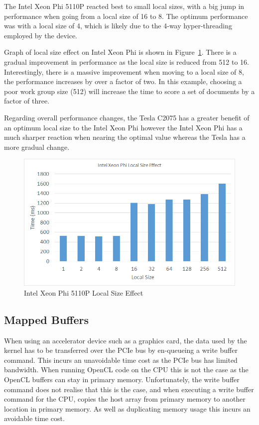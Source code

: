 The Intel Xeon Phi 5110P reacted best to small local sizes, with a big jump in
performance when going from a local size of 16 to 8. The optimum performance was
with a local size of 4, which is likely due to the 4-way hyper-threading
employed by the device.

Graph of local size effect on Intel Xeon Phi is shown in
Figure~\ref{fig:phiLocalSize}. There is a gradual improvement in performance as
the local size is reduced from 512 to 16. Interestingly, there is a massive
improvement when moving to a local size of 8, the performance increases by over
a factor of two. In this example, choosing a poor work group size (512) will
increase the time to score a set of documents by a factor of three.

Regarding overall performance changes, the Tesla C2075 has a greater benefit of
an optimum local size to the Intel Xeon Phi however the Intel Xeon Phi has a
much sharper reaction when nearing the optimal value whereas the Tesla has a
more gradual change.

\begin{figure}[H]
\includegraphics[width=\linewidth]{images/phiLocalSize.png}
\caption{Intel Xeon Phi 5110P Local Size Effect}
\label{fig:phiLocalSize}
\end{figure}

\subsection{Mapped Buffers}

When using an accelerator device such as a graphics card, the data used by the
kernel has to be transferred over the PCIe bus by en-queueing a write buffer
command. This incurs an unavoidable time cost as the PCIe bus has limited
bandwidth. When running OpenCL code on the CPU this is not the case as the
OpenCL buffers can stay in primary memory. Unfortunately, the write buffer
command does not realise that this is the case, and when executing a write
buffer command for the CPU, copies the host array from primary memory to another
location in primary memory. As well as duplicating memory usage this incurs an
avoidable time cost.


